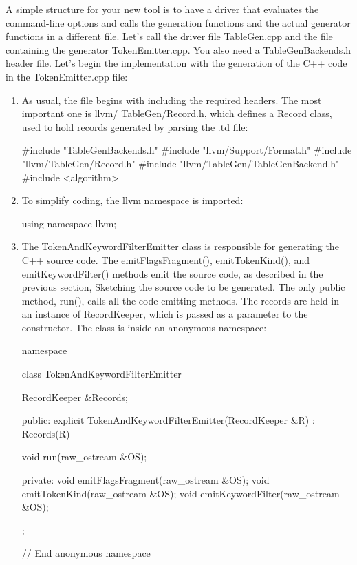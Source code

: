 A simple structure for your new tool is to have a driver that evaluates the command-line options and calls the generation functions and the actual generator functions in a different file. Let’s call the driver file TableGen.cpp and the file containing the generator TokenEmitter.cpp. You also need a TableGenBackends.h header file. Let’s begin the implementation with the generation of the C++ code in the TokenEmitter.cpp file:

\begin{enumerate}
\item
As usual, the file begins with including the required headers. The most important one is llvm/ TableGen/Record.h, which defines a Record class, used to hold records generated by parsing the .td file:

\begin{cpp}
#include "TableGenBackends.h"
#include "llvm/Support/Format.h"
#include "llvm/TableGen/Record.h"
#include "llvm/TableGen/TableGenBackend.h"
#include <algorithm>
\end{cpp}

\item
To simplify coding, the llvm namespace is imported:

\begin{cpp}
using namespace llvm;
\end{cpp}

\item
The TokenAndKeywordFilterEmitter class is responsible for generating the C++ source code. The emitFlagsFragment(), emitTokenKind(), and emitKeywordFilter() methods emit the source code, as described in the previous section, Sketching the source code to be generated. The only public method, run(), calls all the code-emitting methods. The records are held in an instance of RecordKeeper, which is passed as a parameter to the constructor. The class is inside an anonymous namespace:

\begin{cpp}
namespace {
class TokenAndKeywordFilterEmitter {
    RecordKeeper &Records;

public:
    explicit TokenAndKeywordFilterEmitter(RecordKeeper &R)
        : Records(R) {}

    void run(raw_ostream &OS);

private:
    void emitFlagsFragment(raw_ostream &OS);
    void emitTokenKind(raw_ostream &OS);
    void emitKeywordFilter(raw_ostream &OS);
};
} // End anonymous namespace
\end{cpp}


\end{enumerate}
